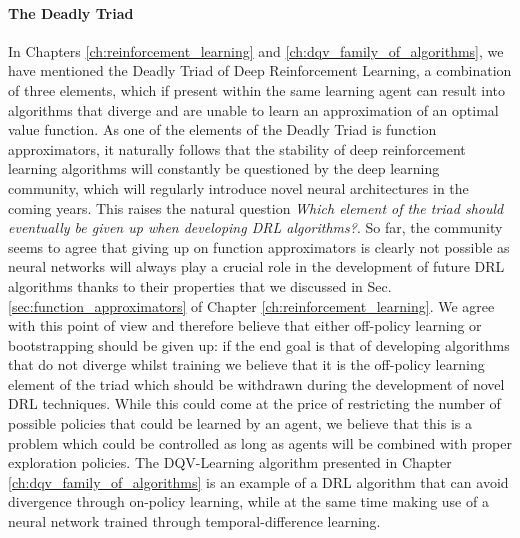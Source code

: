 \paragraph{\textbf{\uppercase{T}he \uppercase{D}eadly \uppercase{T}riad}}
In Chapters \ref{ch:reinforcement_learning} and \ref{ch:dqv_family_of_algorithms}, we have mentioned the Deadly Triad of Deep Reinforcement Learning, a combination of three elements, which if present within the same learning agent can result into algorithms that diverge and are unable to learn an approximation of an optimal value function. As one of the elements of the Deadly Triad is function approximators, it naturally follows that the stability of deep reinforcement learning algorithms will constantly be questioned by the deep learning community, which will regularly introduce novel neural architectures in the coming years. This raises the natural question \textit{Which element of the triad should eventually be given up when developing DRL algorithms?}. So far, the community seems to agree that giving up on function approximators is clearly not possible as neural networks will always play a crucial role in the development of future DRL algorithms \cite{van2018deep_triad,hernandez2019understanding,fedus2020revisiting} thanks to their properties that we discussed in Sec. \ref{sec:function_approximators} of Chapter \ref{ch:reinforcement_learning}. We agree with this point of view and therefore believe that either off-policy learning or bootstrapping should be given up: if the end goal is that of developing algorithms that do not diverge whilst training we believe that it is the off-policy learning element of the triad which should be withdrawn during the development of novel DRL techniques. While this could come at the price of restricting the number of possible policies that could be learned by an agent, we believe that this is a problem which could be controlled as long as agents will be combined with proper exploration policies. The DQV-Learning algorithm presented in Chapter \ref{ch:dqv_family_of_algorithms} is an example of a DRL algorithm that can avoid divergence through on-policy learning, while at the same time making use of a neural network trained through temporal-difference learning. 








